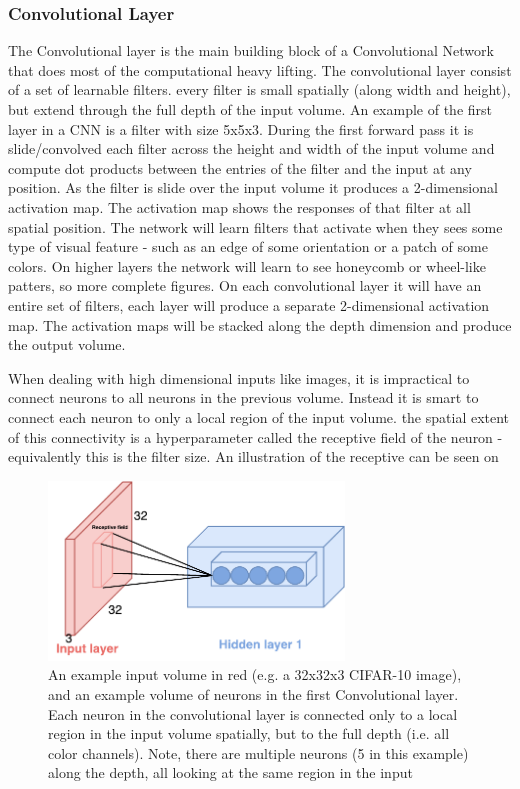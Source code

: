 \subsubsection{Convolutional Layer}
The Convolutional layer is the main building block of a Convolutional Network that does most of the computational heavy lifting. The convolutional layer consist of a set of learnable filters. every filter is small spatially (along width and height), but extend through the full depth of the input volume. An example of the first layer in a CNN is a filter with size 5x5x3. During the first forward pass it is slide/convolved each filter across the height and width of the input volume and compute dot products between the entries of the filter and the input at any position. As the filter is slide over the input volume it produces a 2-dimensional activation map. The activation map shows the responses of that filter at all spatial position. The network will learn filters that activate when they sees some type of visual feature - such as an edge of some orientation or a patch of some colors. On higher layers the network will learn to see honeycomb or wheel-like patters, so more complete figures. On each convolutional layer it will have an entire set of filters, each layer will produce a separate 2-dimensional activation map. The activation maps will be stacked along the depth dimension and produce the output volume. 

When dealing with high dimensional inputs like images, it is impractical to connect neurons to all neurons in the previous volume. Instead it is smart to connect each neuron to only a local region of the input volume. the spatial extent of this connectivity is a hyperparameter  called the receptive field of the neuron - equivalently this is the filter size. An illustration of the receptive can be seen on 

\begin{figure}[H]
	\centering
	\includegraphics[width=0.7\textwidth]{Figures/Respective_field.pdf}
	\caption{An example input volume in red (e.g. a 32x32x3 CIFAR-10 image), and an example volume of neurons in the first Convolutional layer. Each neuron in the convolutional layer is connected only to a local region in the input volume spatially, but to the full depth (i.e. all color channels). Note, there are multiple neurons (5 in this example) along the depth, all looking at the same region in the input \cite{CNN_course}}
	\label{fig:Respective_field}
\end{figure}

